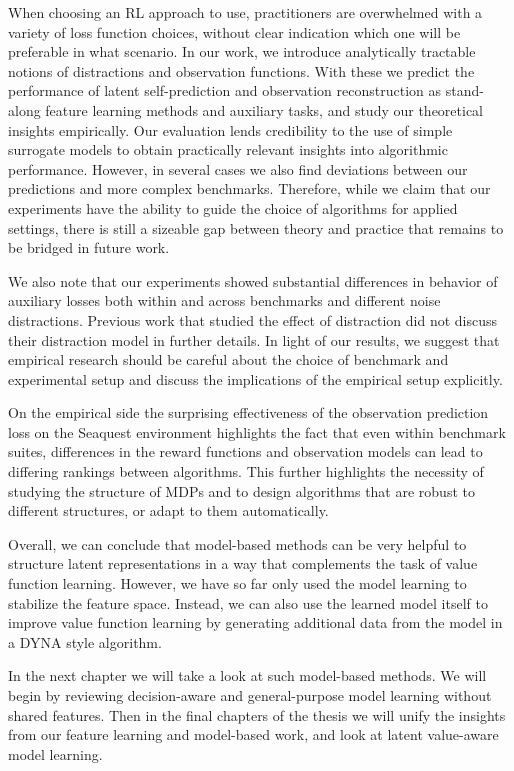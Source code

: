When choosing an RL approach to use, practitioners are overwhelmed with a variety of loss function choices, without clear indication which one will be preferable in what scenario.
In our work, we introduce analytically tractable notions of distractions and observation functions.
With these we predict the performance of latent self-prediction and observation reconstruction as stand-along feature learning methods and auxiliary tasks, and study our theoretical insights empirically.
Our evaluation lends credibility to the use of simple surrogate models to obtain practically relevant insights into algorithmic performance.
However, in several cases we also find deviations between our predictions and more complex benchmarks.
Therefore, while we claim that our experiments have the ability to guide the choice of algorithms for applied settings, there is still a sizeable gap between theory and practice that remains to be bridged in future work.

We also note that our experiments showed substantial differences in behavior of auxiliary losses both within and across benchmarks and different noise distractions.
Previous work that studied the effect of distraction \parencite{nikishin2021control,voelcker2022value,ni2024bridging} did not discuss their distraction model in further details. 
In light of our results, we suggest that empirical research should be careful about the choice of benchmark and experimental setup and discuss the implications of the empirical setup explicitly.

On the empirical side the surprising effectiveness of the observation prediction loss on the Seaquest environment highlights the fact that even within benchmark suites, differences in the reward functions and observation models can lead to differing rankings between algorithms.
This further highlights the necessity of studying the structure of MDPs and to design algorithms that are robust to different structures, or adapt to them automatically.

Overall, we can conclude that model-based methods can be very helpful to structure latent representations in a way that complements the task of value function learning.
However, we have so far only used the model learning to stabilize the feature space.
Instead, we can also use the learned model itself to improve value function learning by generating additional data from the model in a DYNA style algorithm.

In the next chapter we will take a look at such model-based methods.
We will begin by reviewing decision-aware and general-purpose model learning without shared features.
Then in the final chapters of the thesis we will unify the insights from our feature learning and model-based work, and look at latent value-aware model learning.